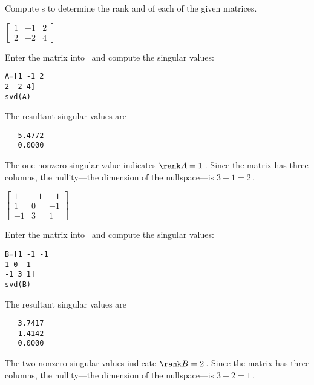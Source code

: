 \begin{example} 
Compute \svd{}s to determine the rank and  of each of the given matrices.
\begin{Parts}
\begin{reduce}
\item \(\begin{bmatrix} 1&-1&2
\\2&-2&4
 \end{bmatrix}\)
\begin{solution} 
Enter the matrix into \script\ and compute the singular values:
\begin{verbatim}
A=[1 -1 2
2 -2 4]
svd(A)
\end{verbatim}
\setbox\ajrqrbox\hbox{}%
\marginajrbox%
The resultant singular values are
\begin{verbatim}
   5.4772
   0.0000
\end{verbatim}
The one nonzero singular value indicates \(\rank A=1\)\,.
Since the matrix has three columns, the nullity---the dimension of the nullspace---is \(3-1=2\)\,. 
\end{solution}
\end{reduce}
 
\item \(\begin{bmatrix} 1&-1&-1
\\1&0&-1
\\-1&3&1 \end{bmatrix}\)
\begin{solution} 
Enter the matrix into \script\ and compute the singular values:
\begin{verbatim}
B=[1 -1 -1
1 0 -1
-1 3 1]
svd(B)
\end{verbatim}
\setbox\ajrqrbox\hbox{}%
\marginajrbox%
The resultant singular values are
\begin{verbatim}
   3.7417
   1.4142
   0.0000
\end{verbatim}
The two nonzero singular values indicate  \(\rank B=2\)\,.
Since the matrix has three columns, the nullity---the dimension of the nullspace---is \(3-2=1\)\,. 
\end{solution}



\end{Parts}
\end{example}
